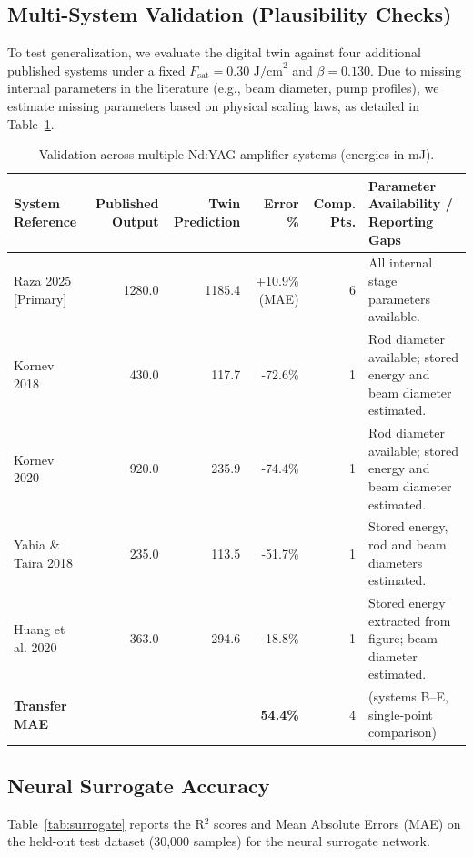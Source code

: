 \documentclass[aps,reprint,twocolumn,amsmath,amssymb,graphicx,nofootinbib]{revtex4-2}
\begin{document}
\subsection{Multi-System Validation (Plausibility Checks)}

To test generalization, we evaluate the digital twin against four additional published systems under a fixed $F_{\text{sat}} = 0.30\text{ J/cm}^2$ and $\beta = 0.130$. Due to missing internal parameters in the literature (e.g., beam diameter, pump profiles), we estimate missing parameters based on physical scaling laws, as detailed in Table~\ref{tab:multisystem}.

\begin{table}[htbp]
\centering
\caption{Validation across multiple Nd:YAG amplifier systems (energies in mJ).}
\label{tab:multisystem}
\begin{tabular}{lrrrrl}
\toprule
System Reference & Published Output & Twin Prediction & Error \% & Comp. Pts. & Parameter Availability / Reporting Gaps \\
\midrule
Raza 2025 [Primary] & 1280.0 & 1185.4 & +10.9\% (MAE) & 6 & All internal stage parameters available. \\
Kornev 2018 & 430.0 & 117.7 & -72.6\% & 1 & Rod diameter available; stored energy and beam diameter estimated. \\
Kornev 2020 & 920.0 & 235.9 & -74.4\% & 1 & Rod diameter available; stored energy and beam diameter estimated. \\
Yahia \& Taira 2018 & 235.0 & 113.5 & -51.7\% & 1 & Stored energy, rod and beam diameters estimated. \\
Huang et al. 2020 & 363.0 & 294.6 & -18.8\% & 1 & Stored energy extracted from figure; beam diameter estimated. \\
\midrule
\textbf{Transfer MAE} & & & \textbf{54.4\%} & 4 & (systems B--E, single-point comparison) \\
\bottomrule
\end{tabular}
\end{table}

\subsection{Neural Surrogate Accuracy}

Table~\ref{tab:surrogate} reports the R$^2$ scores and Mean Absolute Errors (MAE) on the held-out test dataset (30,000 samples) for the neural surrogate network.
\end{document}
